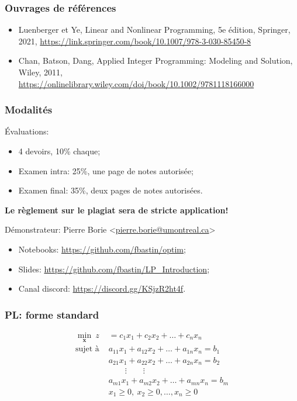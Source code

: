 \documentclass[usepdftitle=false]{beamer}
\def\bx{\boldsymbol{x}}
\begin{document}
\begin{frame}
\frametitle{Ouvrages de références}

\begin{itemize}
	\item
	Luenberger et Ye, Linear and Nonlinear Programming, 5e édition, Springer, 2021, \url{https://link.springer.com/book/10.1007/978-3-030-85450-8}
	\item
	Chan, Batson, Dang, Applied Integer Programming: Modeling and Solution, Wiley, 2011,
	\url{https://onlinelibrary.wiley.com/doi/book/10.1002/9781118166000}
\end{itemize}

\end{frame}

\begin{frame}
\frametitle{Modalités}

Évaluations:
\begin{itemize}
	\item 4 devoirs, 10\% chaque;
	\item Examen intra: 25\%, une page de notes autorisée;
	\item Examen final: 35\%, deux pages de notes autorisées.
\end{itemize}
{\bf Le règlement sur le plagiat sera de stricte application!}

\mbox{}

Démonstrateur: Pierre Borie <\url{pierre.borie@umontreal.ca}>

\mbox{}

\begin{itemize}
	\item 
Notebooks: \url{https://github.com/fbastin/optim};
\item
Slides: \url{https://github.com/fbastin/LP_Introduction};
\item
Canal discord: \url{https://discord.gg/KSjzR2ht4f}.
\end{itemize}

\end{frame}

\begin{frame}
\frametitle{PL: forme standard}

\begin{align*}
\min_{\bx}\ z &= c_1x_1+c_2x_2+\ldots +c_nx_n \\
\mbox{sujet à } &
a_{11}x_1 + a_{12}x_2 + \ldots + a_{1n}x_n = b_1 \\
&a_{21}x_1 + a_{22}x_2 + \ldots + a_{2n}x_n = b_2 \\
& \qquad \vdots \qquad \vdots \\
& a_{m1}x_1 + a_{m2}x_2 + \ldots + a_{mn}x_n = b_m \\
& x_1 \geq 0,\ x_2 \geq 0, \ldots, x_n \geq 0 \\
\end{align*}

\mbox{}
\end{frame}
\end{document}
